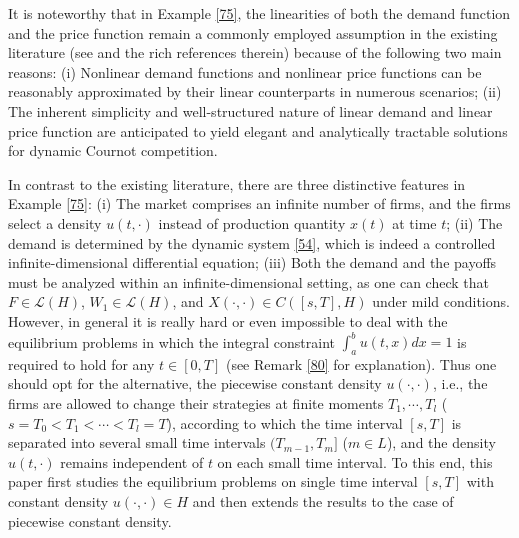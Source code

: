 \documentclass[10pt]{article}
\begin{document}
It is noteworthy that in Example \ref{75}, the linearities of both the demand function and the price function remain a commonly employed assumption in the existing literature (see \citep{cai2019role, chan2015bertrand, MR4237615} and the rich references therein)  because of  the following two main reasons: (i) Nonlinear demand  functions and nonlinear price functions can be reasonably approximated by their linear counterparts in numerous scenarios; (ii) The inherent simplicity and well-structured nature of linear demand and linear price function are anticipated to yield elegant and analytically tractable solutions for dynamic Cournot competition.

In contrast to the existing literature, there are three distinctive features in Example \ref{75}: (i) The market comprises an infinite number of firms, and the  firms select a density   $u(t,\cdot)$ instead of production quantity $x(t)$ at time $t$; (ii) The  demand is determined by the dynamic system \eqref{54}, which is indeed a controlled infinite-dimensional   differential equation;   (iii) Both the demand  and the payoffs  must be analyzed within an infinite-dimensional setting, as  one can check that   $F\in\mathcal{L}(H) $, $W_1\in\mathcal{L}(H)$, and $X(\cdot,\cdot)\in C([s,T],H)$ under mild conditions. However, in general it is really hard or even impossible to deal with the equilibrium problems  in which the integral constraint $\int_a^bu(t,x)dx=1$ is required to hold for any $t\in[0,T]$ (see Remark \ref{80} for explanation).  Thus one should opt for the alternative,    the piecewise constant density $u(\cdot,\cdot)$, i.e., the firms are allowed to change their strategies at finite moments $T_1,\cdots,T_l$ ($s=T_0<T_1<\cdots< T_l=T$), according to which the time interval $[s,T]$ is separated into several small time intervals $(T_{m-1},T_m]$ ($m\in L$), and the density $u(t,\cdot)$ remains  independent of $t$ on each small time interval. To this end, this paper first studies the equilibrium problems on single time interval $[s,T]$ with constant density $u(\cdot,\cdot)\in H$ and then extends the  results to the  case of piecewise constant density.
\end{document}
